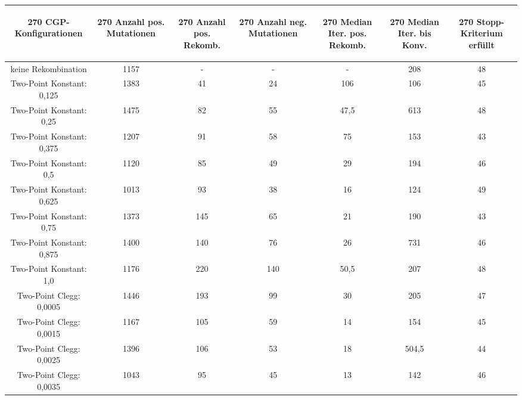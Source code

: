 \begin{table}[H]
	\centering
	\begin{tabular}{c | c | c | c | c | c | c}
		\begin{turn}{270} \textbf{CGP-Konfigurationen} \end{turn} & \begin{turn}{270} \textbf{Anzahl pos. Mutationen} \end{turn} & \begin{turn}{270} \textbf{Anzahl pos. Rekomb.} \end{turn} & \begin{turn}{270} \textbf{Anzahl neg. Mutationen} \end{turn} & \begin{turn}{270} \textbf{Median Iter. pos. Rekomb.} \end{turn} & \begin{turn}{270} \textbf{Median Iter. bis Konv.} \end{turn} & \begin{turn}{270} \textbf{Stopp-Kriterium erfüllt} \end{turn}\\
		\hline
		keine Rekombination & 1157 & - & - & - & 208 & 48\\
		\hline
		Two-Point Konstant: 0,125 & 1383 & 41 & 24 & 106 & 106 & 45\\
		\hline
		Two-Point Konstant: 0,25 & 1475 & 82 & 55 & 47,5 & 613 & 48\\
		\hline
		Two-Point Konstant: 0,375 & 1207 & 91 & 58 & 75 & 153 & 43\\
		\hline
		Two-Point Konstant: 0,5 & 1120 & 85 & 49 & 29 & 194 & 46\\
		\hline
		Two-Point Konstant: 0,625 & 1013 & 93 & 38 & 16 & 124 & 49\\
		\hline
		Two-Point Konstant: 0,75 & 1373 & 145 & 65 & 21 & 190 & 43\\
		\hline
		Two-Point Konstant: 0,875 & 1400 & 140 & 76 & 26 & 731 & 46\\
		\hline
		Two-Point Konstant: 1,0 & 1176 & 220 & 140 & 50,5 & 207 & 48\\
		\hline
		Two-Point Clegg: 0,0005 & 1446 & 193 & 99 & 30 & 205 & 47\\
		\hline
		Two-Point Clegg: 0,0015 & 1167 & 105 & 59 & 14 & 154 & 45\\
		\hline
		Two-Point Clegg: 0,0025 & 1396 & 106 & 53 & 18 & 504,5 & 44\\
		\hline
		Two-Point Clegg: 0,0035 & 1043 & 95 & 45 & 13 & 142 & 46\\

\end{tabular}
\end{table}
